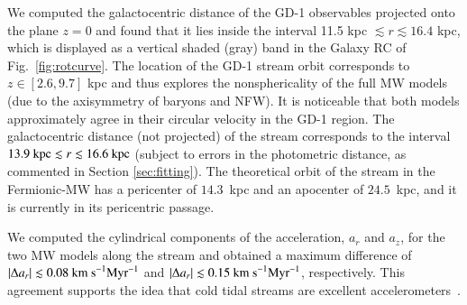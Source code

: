 \documentclass[twocolumn]{aa}
\begin{document}
We computed the galactocentric distance of the GD-1 observables projected onto the plane $z=0$ and found that it lies inside the interval 11.5 kpc $\lesssim r \lesssim 16.4$ kpc, which is displayed as a vertical shaded (gray) band in the Galaxy RC of Fig.~\ref{fig:rotcurve}. The location of the GD-1 stream orbit corresponds to $z\in [2.6, 9.7]$ kpc and thus explores the nonsphericality of the full MW models (due to the axisymmetry of baryons and NFW).
It is noticeable that both models approximately agree in their circular velocity in the GD-1 region.
The galactocentric distance (not projected) of the stream corresponds to the interval $13.9~\textrm{kpc} \lesssim r \lesssim 16.6~\rm{kpc}$ (subject to errors in the photometric distance, as commented in Section \ref{sec:fitting}). The theoretical orbit of the stream in the Fermionic-MW has a pericenter of $14.3$~kpc and an apocenter of $24.5$~kpc, and it is currently in its pericentric passage.

We computed the cylindrical components of the acceleration, $a_r$ and $a_z$,
for the two MW models along the stream and obtained a maximum difference of $|\Delta a_r| \lesssim 0.08 \rm{~km~s}^{-1} \rm{Myr}^{-1}$ and $|\Delta a_r| \lesssim 0.15 \rm{~km~s}^{-1} \rm{Myr}^{-1}$, respectively. This agreement supports  the idea that cold tidal streams are excellent accelerometers~\citep{Ibata_2016,2022ApJ...940...22N,2023ApJ...945L..32C}.
\end{document}

